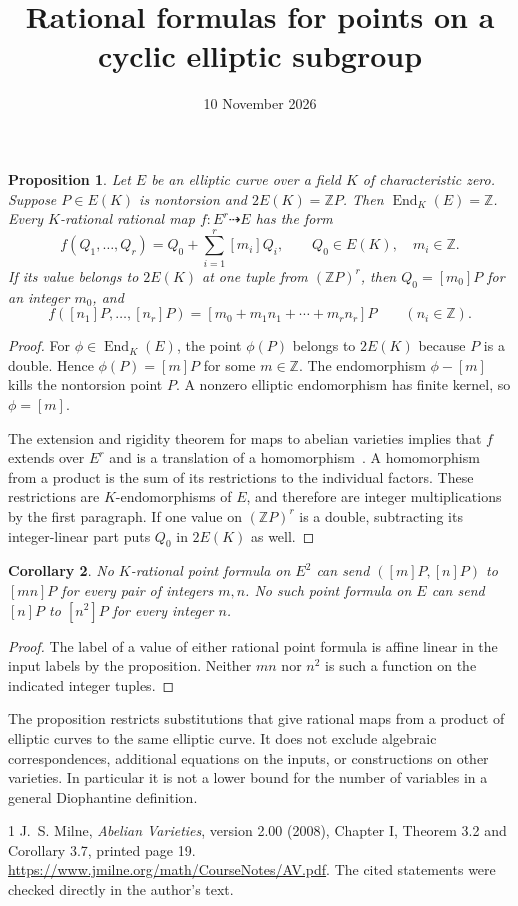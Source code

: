 \documentclass[11pt,a4paper]{article}
\title{Rational formulas for points on a cyclic elliptic subgroup}
\author{}\date{10 November 2026}
\newtheorem{proposition}{Proposition}
\newtheorem{corollary}[proposition]{Corollary}
\newcommand{\Z}{\mathbb Z}
\begin{document}
\maketitle

\begin{proposition}
Let $E$ be an elliptic curve over a field $K$ of characteristic zero.
Suppose $P\in E(K)$ is nontorsion and $2E(K)=\Z P$.
Then $\operatorname{End}_K(E)=\Z$.
Every $K$-rational rational map $f:E^r\dashrightarrow E$ has the form
\[
                 f(Q_1,\ldots,Q_r)=Q_0+\sum_{i=1}^r[m_i]Q_i,
                 \qquad Q_0\in E(K),\quad m_i\in\Z.
\]
If its value belongs to $2E(K)$ at one tuple from $(\Z P)^r$,
then $Q_0=[m_0]P$ for an integer $m_0$, and
\[
 f([n_1]P,\ldots,[n_r]P)
                    =[m_0+m_1n_1+\cdots+m_rn_r]P
                    \qquad(n_i\in\Z).
\]
\end{proposition}
\begin{proof}
For $\phi\in\operatorname{End}_K(E)$, the point $\phi(P)$
belongs to $2E(K)$ because $P$ is a double. Hence
$\phi(P)=[m]P$ for some $m\in\Z$. The endomorphism
$\phi-[m]$ kills the nontorsion point $P$. A nonzero elliptic
endomorphism has finite kernel, so $\phi=[m]$.

The extension and rigidity theorem for maps to abelian varieties
implies that $f$ extends over $E^r$ and is a translation of a
homomorphism~\cite[Chapter I, Corollary 3.7]{Milne}.
A homomorphism from a product is the sum of its restrictions to
the individual factors. These restrictions are $K$-endomorphisms
of $E$, and therefore are integer multiplications by the first
paragraph. If one value on $(\Z P)^r$ is a double, subtracting
its integer-linear part puts $Q_0$ in $2E(K)$ as well.
\end{proof}

\begin{corollary}
No $K$-rational point formula on $E^2$ can send
$([m]P,[n]P)$ to $[mn]P$ for every pair of integers $m,n$.
No such point formula on $E$ can send $[n]P$ to $[n^2]P$
for every integer $n$.
\end{corollary}
\begin{proof}
The label of a value of either rational point formula is affine
linear in the input labels by the proposition. Neither $mn$ nor
$n^2$ is such a function on the indicated integer tuples.
\end{proof}

The proposition restricts substitutions that give rational maps from
a product of elliptic curves to the same elliptic curve. It does not
exclude algebraic correspondences, additional equations on the inputs,
or constructions on other varieties. In particular it is not a lower
bound for the number of variables in a general Diophantine definition.

\begin{thebibliography}{1}
J.~S. Milne, \emph{Abelian Varieties}, version 2.00 (2008),
Chapter I, Theorem 3.2 and Corollary 3.7, printed page 19.
\url{https://www.jmilne.org/math/CourseNotes/AV.pdf}.
The cited statements were checked directly in the author's text.
\end{thebibliography}
\end{document}
